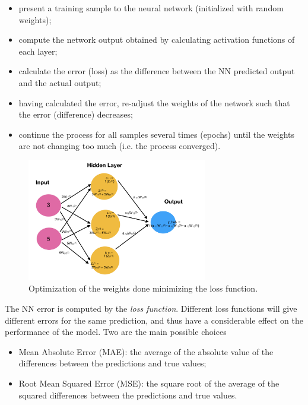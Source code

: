 \begin{itemize}
	\tightlist
	\item
	present a training sample to the neural network (initialized with
	random weights);
	\item
	compute the network output obtained by calculating activation functions of each layer;
	\item
	calculate the error (loss) as the difference between the NN predicted
	output and the actual output;
	\item
	having calculated the error, re-adjust the weights of the network such
	that the error (difference) decreases;
	\item
	continue the process for all samples several times (epochs) until the
	weights are not changing too much (i.e. the process converged).
\end{itemize}

\begin{figure}[htb]
	\centering
	\includegraphics[width=0.7\textwidth]{figures/training_nn}
	\caption{Optimization of the weights done minimizing the loss function.}
\end{figure}

The NN error is computed by the \emph{loss function}. Different loss
functions will give different errors for the same prediction, and thus
have a considerable effect on the performance of the model. Two are the
main possible choices

\begin{itemize}
	\tightlist
	\item
	Mean Absolute Error (MAE): the average of the absolute value of the
	differences between the predictions and true values;
	\item
	Root Mean Squared Error (MSE): the square root of the average of the
	squared differences between the predictions and true values.
\end{itemize}

